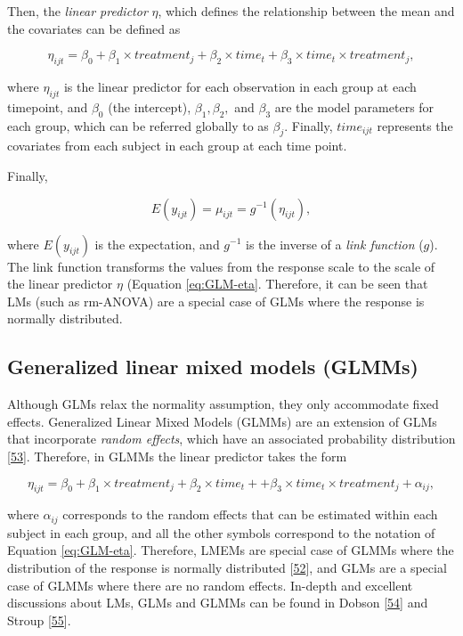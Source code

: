 \documentclass[
]{article}
\begin{document}
Then, the \emph{linear predictor} \(\eta\), which defines the relationship between the mean and the covariates can be defined as

\begin{equation}
\eta_{ijt}=\beta_0+\beta_1 \times treatment_{j} +\beta_2 \times time_{t} +\beta_3 \times time_{t}\times treatment_{j},
\label{eq:GLM-eta}
\end{equation}

where \(\eta_{ijt}\) is the linear predictor for each observation in each group at each timepoint, and \(\beta_0\) (the intercept), \(\beta_{1}, \beta_2,\) and \(\beta_3\) are the model parameters for each group, which can be referred globally to as \(\beta_j\). Finally, \(time_{ijt}\) represents the covariates from each subject in each group at each time point.

Finally,

\begin{equation}
E(y_{ijt})=\mu_{ijt}=g^{-1}(\eta_{ijt}),
\label{eq:GLM-Expectation}
\end{equation}

where \(E(y_{ijt})\) is the expectation, and \(g^{-1}\) is the inverse of a \emph{link function} (\(g\)). The link function transforms the values from the response scale to the scale of the linear predictor \(\eta\) (Equation \eqref{eq:GLM-eta}. Therefore, it can be seen that LMs (such as rm-ANOVA) are a special case of GLMs where the response is normally distributed.

\hypertarget{generalized-linear-mixed-models-glmms}{%
\subsection{Generalized linear mixed models (GLMMs)}\label{generalized-linear-mixed-models-glmms}}

Although GLMs relax the normality assumption, they only accommodate fixed effects. Generalized Linear Mixed Models (GLMMs) are an extension of GLMs that incorporate \emph{random effects}, which have an associated probability distribution {[}\protect\hyperlink{ref-mcculloch2001}{53}{]}. Therefore, in GLMMs the linear predictor takes the form

\begin{equation}
\eta_{ijt}=\beta_0+\beta_1 \times treatment_{j} + \beta_2 \times time_{t} + +\beta_3 \times time_{t}\times treatment_{j}+\alpha_{ij},
\label{eq:GLMM-eta}
\end{equation}

where \(\alpha_{ij}\) corresponds to the random effects that can be estimated within each subject in each group, and all the other symbols correspond to the notation of Equation \eqref{eq:GLM-eta}. Therefore, LMEMs are special case of GLMMs where the distribution of the response is normally distributed {[}\protect\hyperlink{ref-nelder1972}{52}{]}, and GLMs are a special case of GLMMs where there are no random effects. In-depth and excellent discussions about LMs, GLMs and GLMMs can be found in Dobson {[}\protect\hyperlink{ref-dobson2008}{54}{]} and Stroup {[}\protect\hyperlink{ref-stroup2013}{55}{]}.
\end{document}
